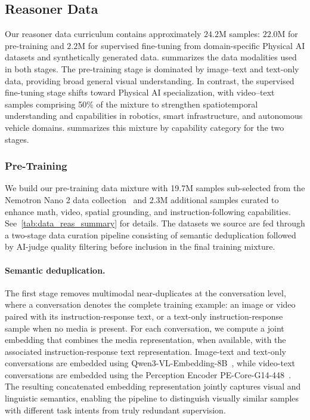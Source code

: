 \subsection{Reasoner Data}
\label{subsec::data_reasoner}

Our reasoner data curriculum contains approximately $24.2$M samples: $22.0$M for pre-training and $2.2$M for supervised fine-tuning from domain-specific Physical AI datasets and synthetically generated data.  summarizes the data modalities used in both stages. The pre-training stage is dominated by image--text and text-only data, providing broad general visual understanding. In contrast, the supervised fine-tuning stage shifts toward Physical AI specialization, with video--text samples comprising 50\% of the mixture to strengthen spatiotemporal understanding and capabilities in robotics, smart infrastructure, and autonomous vehicle domains.  summarizes this mixture by capability category for the two stages.  




\subsubsection{Pre-Training}
\label{subsubsec::data_reas_pretrain}

We build our pre-training data mixture with 19.7M samples sub-selected from the Nemotron Nano 2 data collection~\citep{nvidia2025nvidianemotronnanov2} and 2.3M additional samples curated to enhance math, video, spatial grounding, and instruction-following capabilities. See~\cref{tab:data_reas_summary} for details.
The datasets we source are fed through a two-stage data curation pipeline consisting of semantic deduplication followed by AI-judge quality filtering before inclusion in the final training mixture.

\paragraph{Semantic deduplication.}
The first stage removes multimodal near-duplicates at the conversation level, where a conversation denotes the complete training example: an image or video paired with its instruction-response text, or a text-only instruction-response sample when no media is present. For each conversation, we compute a joint embedding that combines the media representation, when available, with the associated instruction-response text representation. Image-text and text-only conversations are embedded using Qwen3-VL-Embedding-8B~\citep{qwen3vlembedding}, while video-text conversations are embedded using the Perception Encoder PE-Core-G14-448~\citep{bolya2025PerceptionEncoder}. The resulting concatenated embedding representation jointly captures visual and linguistic semantics, enabling the pipeline to distinguish visually similar samples with different task intents from truly redundant supervision. 

